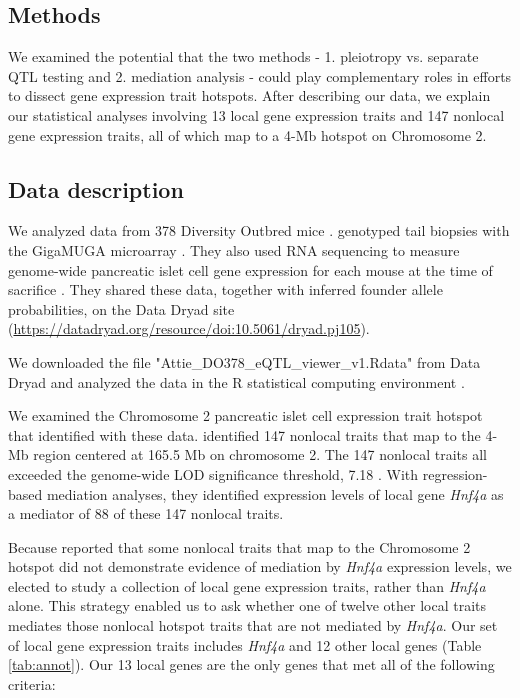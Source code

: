 \documentclass{article}
\begin{document}
\begin{boehm}
\section{Methods}

We examined the potential that the two methods - 1. pleiotropy vs. separate QTL testing and 2. mediation analysis - could play complementary roles in efforts to dissect gene expression trait hotspots. After describing our data, we explain our statistical analyses involving 13 local gene expression traits and 147 nonlocal gene expression traits, all of which map to a 4-Mb hotspot on Chromosome 2.

\subsection{Data description}

We analyzed data from 378 Diversity Outbred mice \citep{keller2018genetic}. \citet{keller2018genetic} genotyped tail biopsies with the GigaMUGA microarray \citep{morgan2015mouse}. They also used RNA sequencing to measure genome-wide pancreatic islet cell gene expression for each mouse at the time of sacrifice \citep{keller2018genetic}. They shared these data, together with inferred founder allele probabilities, on the Data Dryad site (\url{https://datadryad.org/resource/doi:10.5061/dryad.pj105}).

We downloaded the file "Attie\_DO378\_eQTL\_viewer\_v1.Rdata" from Data Dryad \citep{keller2018genetic} and analyzed the data in the R statistical computing environment \citep{r}.

We examined the Chromosome 2 pancreatic islet cell expression trait hotspot that \citet{keller2018genetic} identified with these data. \citet{keller2018genetic} identified 147 nonlocal traits that map to the 4-Mb region centered at 165.5 Mb on chromosome 2. The 147 nonlocal traits all exceeded the genome-wide LOD significance threshold, 7.18 \citep{keller2018genetic}. With regression-based mediation analyses, they identified expression levels of local gene \emph{Hnf4a} as a mediator of 88 of these 147 nonlocal traits.

Because \citet{keller2018genetic} reported that some nonlocal traits that map to the Chromosome 2 hotspot did not demonstrate evidence of mediation by \emph{Hnf4a} expression levels, we elected to study a collection of local gene expression traits, rather than \emph{Hnf4a} alone. This strategy enabled us to ask whether one of twelve other local traits mediates those nonlocal hotspot traits that are not mediated by \emph{Hnf4a}. Our set of local gene expression traits includes \emph{Hnf4a} and 12 other local genes (Table \ref{tab:annot}). Our 13 local genes are the only genes that met all of the following criteria:


\end{boehm}
\end{document}

